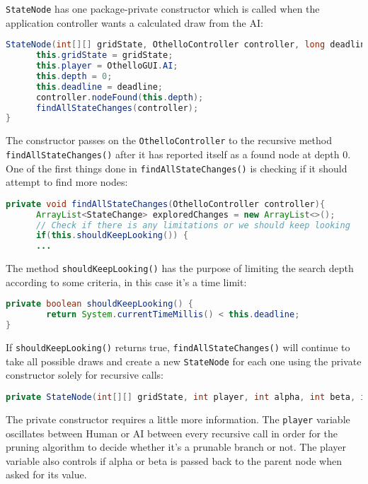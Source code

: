 \documentclass{article}
\begin{document}
\verb|StateNode| has one package-private constructor which is called when the application
controller wants a calculated draw from the AI:

\begin{lstlisting}[language=Java]
StateNode(int[][] gridState, OthelloController controller, long deadline){
      this.gridState = gridState;
      this.player = OthelloGUI.AI;
      this.depth = 0;
      this.deadline = deadline;
      controller.nodeFound(this.depth);
      findAllStateChanges(controller);
}
\end{lstlisting}

The constructor passes on the \verb|OthelloController| to the recursive method
\verb|findAllStateChanges()| after it has reported itself as a found node at depth 0.
One of the first things done in \verb|findAllStateChanges()| is checking if it should
attempt to find more nodes:

\begin{lstlisting}[language=Java]
private void findAllStateChanges(OthelloController controller){
      ArrayList<StateChange> exploredChanges = new ArrayList<>();
      // Check if there is any limitations or we should keep looking
      if(this.shouldKeepLooking()) {
      ...
\end{lstlisting}

The method \verb|shouldKeepLooking()| has the purpose of limiting the search depth
according to some criteria, in this case it's a time limit:

\begin{lstlisting}[language=Java]
private boolean shouldKeepLooking() {
        return System.currentTimeMillis() < this.deadline;
}
\end{lstlisting}

If \verb|shouldKeepLooking()| returns true, \verb|findAllStateChanges()| will continue to take
all possible draws and create a new \verb|StateNode| for each one using the private
constructor solely for recursive calls:

\begin{lstlisting}[language=Java]
private StateNode(int[][] gridState, int player, int alpha, int beta, int depth, OthelloController controller, long deadline)
\end{lstlisting}

The private constructor requires a little more information. The \verb|player|
variable oscillates between Human or AI between every recursive call in order for the
pruning algorithm to decide whether it's a prunable branch or not. The player variable
also controls if alpha or beta is passed back to the parent node when asked for its value.
\end{document}
